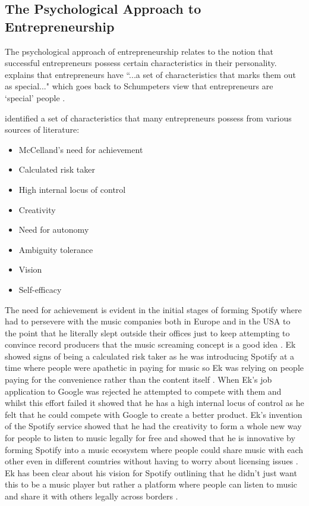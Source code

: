 \subsection{The Psychological Approach to Entrepreneurship}
The psychological approach of entrepreneurship relates to the notion that successful entrepreneurs possess certain characteristics in their personality. \textcite[][13]{deakins2012} explains that entrepreneurs have ``...a set of characteristics that marks them out as special..." which goes back to Schumpeters view that entrepreneurs are `special' people \parencite[][9]{deakins2012}.
\par
\textcite[][14]{deakins2012} identified a set of characteristics that many entrepreneurs possess from various sources of literature:
\begin{itemize}
    \item McCelland's need for achievement
    \item Calculated risk taker
    \item High internal locus of control
    \item Creativity
    \item Need for autonomy
    \item Ambiguity tolerance
    \item Vision
    \item Self-efficacy
\end{itemize}
The need for achievement is evident in the initial stages of forming Spotify where had to persevere with the music companies both in Europe and in the USA to the point that he literally slept outside their offices just to keep attempting to convince record producers that the music screaming concept is a good idea \parencite{lynskey2013}. Ek showed signs of being a calculated risk taker as he was introducing Spotify at a time where people were apathetic in paying for music \parencite{lynskey2013} so Ek was relying on people paying for the convenience rather than the content itself \parencite{lynskey2013}. When Ek's job application to Google was rejected \parencite{edgecliffejohnson2016} he attempted to compete with them and whilst this effort failed \parencite{edgecliffejohnson2016} it showed that he has a high internal locus of control as he felt that he could compete with Google to create a better product. Ek's invention of the Spotify service showed that he had the creativity to form a whole new way for people to listen to music legally for free \parencite{dyer2013} and showed that he is innovative by forming Spotify into a music ecosystem where people could share music with each other even in different countries without having to worry about licensing issues \parencite{dyer2013}. Ek has been clear about his vision for Spotify outlining that he didn't just want this to be a music player but rather a platform where people can listen to music and share it with others legally across borders \parencite{dyer2013}.
